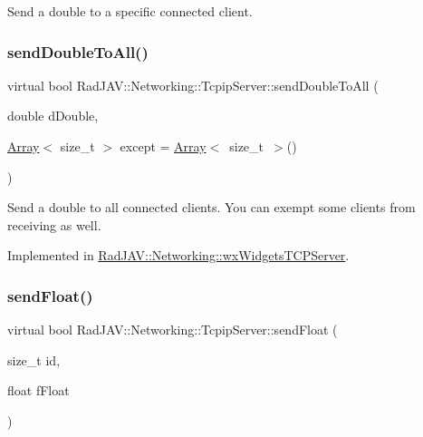 Send a double to a specific connected client. \mbox{\label{class_rad_j_a_v_1_1_networking_1_1_tcpip_server_a77ef40e188197fd44d7deb4d106c8b72}} 
\subsubsection{\texorpdfstring{send\+Double\+To\+All()}{sendDoubleToAll()}}
{\footnotesize\ttfamily virtual bool Rad\+J\+A\+V\+::\+Networking\+::\+Tcpip\+Server\+::send\+Double\+To\+All (\begin{DoxyParamCaption}\item[{double}]{d\+Double,  }\item[{\mbox{\hyperlink{class_rad_j_a_v_1_1_array}{Array}}$<$ size\+\_\+t $>$}]{except = {\ttfamily \mbox{\hyperlink{class_rad_j_a_v_1_1_array}{Array}}$<$~size\+\_\+t~$>$()} }\end{DoxyParamCaption})\hspace{0.3cm}{\ttfamily [pure virtual]}}

Send a double to all connected clients. You can exempt some clients from receiving as well. 

Implemented in \mbox{\hyperlink{class_rad_j_a_v_1_1_networking_1_1wx_widgets_t_c_p_server_a24e90f9fd8da7f16c365f4e3ae00c565}{Rad\+J\+A\+V\+::\+Networking\+::wx\+Widgets\+T\+C\+P\+Server}}.

\mbox{\label{class_rad_j_a_v_1_1_networking_1_1_tcpip_server_a4bfecbdc9651e81b5bb0ac50f17d9063}} 
\subsubsection{\texorpdfstring{send\+Float()}{sendFloat()}}
{\footnotesize\ttfamily virtual bool Rad\+J\+A\+V\+::\+Networking\+::\+Tcpip\+Server\+::send\+Float (\begin{DoxyParamCaption}\item[{size\+\_\+t}]{id,  }\item[{float}]{f\+Float }\end{DoxyParamCaption})\hspace{0.3cm}{\ttfamily [pure virtual]}}

